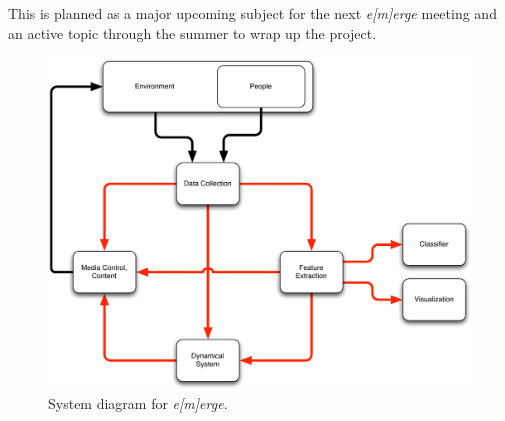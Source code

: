 \documentclass{article}
\newcommand{\emerge}{\emph{e[m]erge}\xspace}
\begin{document}
This is planned as a major upcoming subject for the next \emerge
meeting and an active topic through the summer to wrap up the project.

\begin{figure}
\centerline{
  \includegraphics[width=4.5in]{system_diagram.pdf}}
  \caption{System diagram for \emerge.}
\label{fig:system}
\end{figure}



\end{document}
